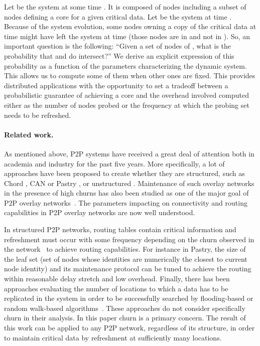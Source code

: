 \documentclass[]{llncs}
\begin{document}
Let  be the system at some time . It is composed of 
 nodes including a subset of  nodes defining a core  for a 
given critical data.  Let  be the system at time .
Because of the system evolution, 
some nodes owning a copy of the  critical data at time  might have
left the system at time  (those nodes are in  and not in
).  So, an important question is the following: 
``Given a set   of   nodes of ,  what is the probability that
 and  do intersect?'' We derive an explicit expression of this probability as a function of
the parameters characterizing the dynamic system.
This allows us to  compute some  of them
when other ones are fixed. 
This provides distributed 
applications with the opportunity to set a tradeoff between a probabilistic 
guarantee of achieving a core  and the overhead involved computed either 
as the number of nodes probed or the frequency at which the probing set needs
to be refreshed.

\paragraph{Related work.}
As mentioned above, P2P systems have received a great deal of
attention both in academia  
and  industry  for  the  past  five  years. More  specifically,  a  lot  of
approaches have been proposed to  
create whether they are structured,  such as Chord \cite{stoica.i2001}, CAN
\cite{ratnasamy.s2001}  or Pastry  \cite{rowstron.a2001c},  or unstructured
\cite{lpbcast,ganesh.a2003,JGKvS04}. Maintenance of such overlay networks
in the presence of high churns has also been studied as one
of the  major goal of P2P overlay networks~\cite{LBK02}.  The parameters 
impacting on connectivity and routing capabilities in P2P overlay networks  
are now well understood. 

In structured  P2P networks, routing tables contain critical information
and refreshment must occur with some frequency depending on the churn 
observed in the  network~\cite{castro2004} to achieve routing 
capabilities.
For instance in Pastry, the  size of the leaf set (set of nodes whose 
identities are numerically the closest to current node identity) and its 
maintenance protocol can be tuned to achieve the routing within reasonable  
delay stretch and low overhead.
Finally, there has been approaches evaluating the number of locations
to which a data has to be replicated
in the  system in  order to be  successfully searched by  flooding-based or
random walk-based algorithms~\cite{cohen2002}.  These approaches do 
not consider specifically churn in their analysis. 
In this paper churn is a primary concern.  The result of this work can
be applied to any P2P network, regardless of its structure, in order
to maintain critical data by refreshment at sufficiently many locations.
\end{document}
